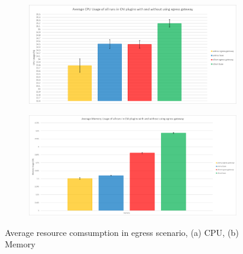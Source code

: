 \begin{figure}[H]
    \centering
    \begin{subfigure}[b]{0.55\textwidth}
        \includegraphics[width=\textwidth]{plots/egress/cpu_total_average.png}
        \caption{}
        \label{fig:cpu_avg}
    \end{subfigure}
    \begin{subfigure}[b]{0.55\textwidth}
        \includegraphics[width=\textwidth]{plots/egress/memory_total_average.png}
        \caption{}
        \label{fig:memory_avg}
    \end{subfigure}
    
    \caption{Average resource comsumption in egress scenario, (a) CPU, (b) Memory}
    \label{fig:res_avg}
\end{figure}



